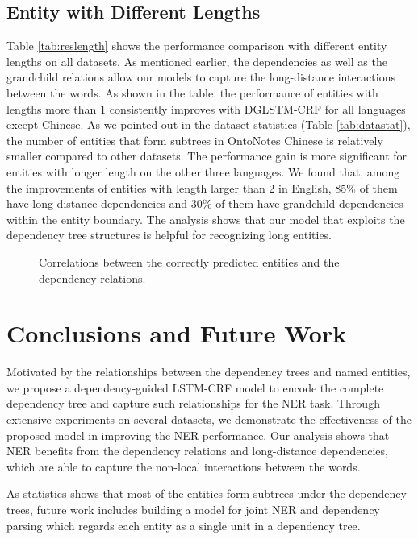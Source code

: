 \documentclass[11pt,a4paper]{article}
\begin{document}
\subsection{Entity with Different Lengths}
Table \ref{tab:reslength} shows the performance comparison with different entity lengths on all datasets. 
As mentioned earlier, the dependencies as well as the grandchild relations allow our models to capture the long-distance interactions between the words. 
As shown in the table, the performance of entities with lengths more than 1 consistently improves with DGLSTM-CRF for all languages except Chinese.
As we pointed out in the dataset statistics (Table \ref{tab:datastat}),  the number of entities that form subtrees in OntoNotes Chinese is relatively smaller compared to other datasets.
The performance gain is more significant for entities with longer length on the other three languages. 
We found that, among the improvements of entities with length larger than 2 in English, 85\% of them have long-distance dependencies and 30\% of them have grandchild dependencies within the entity boundary. 
The analysis shows that our model that exploits the dependency tree structures is helpful for recognizing long entities.




\begin{figure}[t!]
	\centering
\caption{Correlations between the correctly predicted entities and the dependency relations.}
	\label{fig:deprelana}
\end{figure}


\section{Conclusions and Future Work}
Motivated by the relationships between the dependency trees and named entities, we propose a dependency-guided LSTM-CRF model to encode the complete dependency tree and capture such relationships for the NER task. 
Through extensive experiments on several datasets, we demonstrate the effectiveness of the proposed model in improving the NER performance. 
Our analysis shows that NER benefits from the dependency relations and long-distance dependencies, which are able to capture the non-local interactions between the words. 


As statistics shows that most of the entities form subtrees under the dependency trees, future work includes building a model for joint NER and dependency parsing which regards each entity as a single unit in a dependency tree. 
\end{document}
